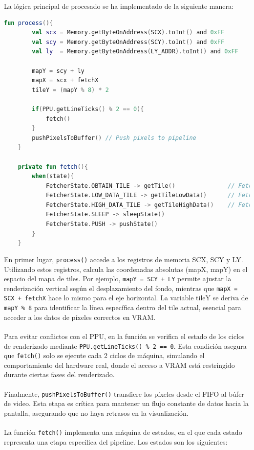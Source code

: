 La lógica principal de procesado se ha implementado de la siguiente manera:

\begin{lstlisting}[language=Kotlin, caption={Código principal del FIFO Fetcher.}, label={code:ppufifoprocess}]
    fun process(){
        val scx = Memory.getByteOnAddress(SCX).toInt() and 0xFF
        val scy = Memory.getByteOnAddress(SCY).toInt() and 0xFF
        val ly  = Memory.getByteOnAddress(LY_ADDR).toInt() and 0xFF

        mapY = scy + ly
        mapX = scx + fetchX
        tileY = (mapY % 8) * 2

        if(PPU.getLineTicks() % 2 == 0){
            fetch()
        }
        pushPixelsToBuffer() // Push pixels to pipeline
    }

    private fun fetch(){
        when(state){
            FetcherState.OBTAIN_TILE -> getTile()               // Fetch the current tile identification in the BG Tilemap
            FetcherState.LOW_DATA_TILE -> getTileLowData()      // Fetch the low byte of the tile
            FetcherState.HIGH_DATA_TILE -> getTileHighData()    // Fetch the high byte of the tile
            FetcherState.SLEEP -> sleepState()
            FetcherState.PUSH -> pushState()
        }
    }
\end{lstlisting}

En primer lugar, \texttt{process()} accede a los registros de memoria SCX, SCY y LY. Utilizando estos registros, calcula las coordenadas absolutas (mapX, mapY) en el espacio del mapa de tiles. Por ejemplo, \texttt{mapY = SCY + LY} permite ajustar la renderización vertical según el desplazamiento del fondo, mientras que \texttt{mapX = SCX + fetchX} hace lo mismo para el eje horizontal. La variable tileY se deriva de \texttt{mapY \% 8} para identificar la línea específica dentro del tile actual, esencial para acceder a los datos de píxeles correctos en VRAM.
\\\\
Para evitar conflictos con el PPU, en la función se verifica el estado de los ciclos de renderizado mediante \texttt{PPU.getLineTicks() \% 2 == 0}. Esta condición asegura que \texttt{fetch()} solo se ejecute cada 2 ciclos de máquina, simulando el comportamiento del hardware real, donde el acceso a VRAM está restringido durante ciertas fases del renderizado.
\\\\
Finalmente, \texttt{pushPixelsToBuffer()} transfiere los píxeles desde el FIFO al búfer de video. Esta etapa es crítica para mantener un flujo constante de datos hacia la pantalla, asegurando que no haya retrasos en la visualización.
\\\\
La función \texttt{fetch()} implementa una máquina de estados, en el que cada estado representa una etapa específica del pipeline. Los estados son los siguientes:

